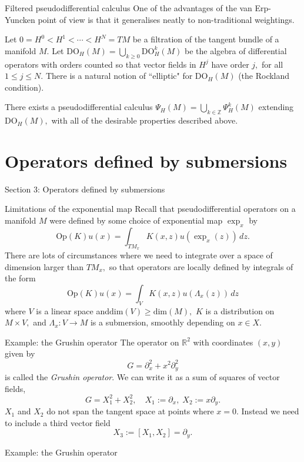 \documentclass{beamer}
\numberwithin{equation}{section}
\theoremstyle{plain}
\theoremstyle{plain}
\theoremstyle{definition}
\theoremstyle{plain}
\theoremstyle{plain}
\theoremstyle{definition}
\newcommand{\Rl}{\mathbb{R}}
\newcommand{\Itgr}{\mathbb{Z}}
\newcommand{\Op}{\mathrm{Op}}
\begin{document}
\begin{frame}{Filtered pseudodifferential calculus}
    One of the advantages of the van Erp-Yuncken point of view is that it generalises neatly to non-traditional weightings. 
    \pause
    
    Let $0=H^0<H^1 < \cdots < H^N = TM$ be a filtration of the tangent bundle of a manifold $M.$ Let $\mathrm{DO}_H(M) = \bigcup_{k\geq 0} \mathrm{DO}_H^k(M)$ be the algebra of differential operators with orders counted so that vector fields in $H^j$ have order $j,$ for all $1\leq j\leq N.$ There is a natural notion of ``elliptic" for $\mathrm{DO}_H(M)$ (the Rockland condition).
        
    \begin{theorem}
        There exists a pseudodifferential calculus $\Psi_H(M) = \bigcup_{k\in \Itgr} \Psi^k_H(M)$ extending $\mathrm{DO}_H(M),$ 
        with all of the desirable properties described above.
    \end{theorem}
\end{frame}



\section{Operators defined by submersions}

\begin{frame}
    \huge{Section 3: Operators defined by submersions}
\end{frame}

\begin{frame}{Limitations of the exponential map}
    Recall that pseudodifferential operators on a manifold $M$ were defined by some choice of exponential map $\exp_x$ by 
    \[
        \Op(K)u(x) = \int_{TM_x} K(x,z)u(\exp_x(z))\,dz.
    \]
    There are lots of circumstances where we need to integrate over a space of dimension larger than $TM_x,$ so that operators are locally defined by integrals of the form
    \[
        \Op(K)u(x) = \int_V K(x,z)u(\Lambda_x(z))\,dz
    \]
    where $V$ is a linear space and$\mathrm{dim}(V)\geq \mathrm{dim}(M),$ $K$ is a distribution on $M\times V,$ and $\Lambda_x:V\to M$ is a submersion, smoothly depending on $x \in X.$   
\end{frame}

\begin{frame}{Example: the Grushin operator}
    The operator on $\Rl^2$ with coordinates $(x,y)$ given by
    \[
        G = \partial_x^2+x^2\partial_y^2
    \]
    is called the \emph{Grushin operator}. We can write it as a sum of squares of vector fields,
    \[
        G = X_1^2+X_2^2,\quad X_1 := \partial_x,\; X_2 := x\partial_y.
    \]
    $X_1$ and $X_2$ do not span the tangent space at points where $x=0.$ Instead we need to include a third vector field
    \[
        X_3 := [X_1,X_2] = \partial_y.
    \]
\end{frame}

\begin{frame}{Example: the Grushin operator}
    
\end{frame}




\begin{frame}
\end{frame}
\end{document}
